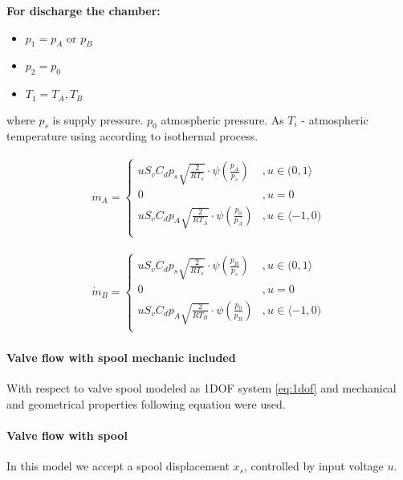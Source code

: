 \textbf{For discharge the chamber:}
\begin{itemize}
\item $p_1 = p_A \text{ or } p_B$
\item $p_2 = p_0$
\item $T_1 = T_A, T_B$
\end{itemize}

where $p_s$ is supply pressure. $p_0$ atmospheric pressure. As $T_i$ - 
atmospheric temperature using according to isothermal process.

\begin{align}
    \dot{m}_A =
    \begin{cases}
        u S_v C_d p_s \sqrt{\frac{2}{RT_s}}
        \cdot \psi\left(\frac{p_A}{p_s}\right)  &,   u \in (0, 1 \rangle \\
        0   &,  u = 0 \\
        u S_v C_d p_A \sqrt{\frac{2}{RT_A}}
        \cdot \psi\left(\frac{p_0}{p_A}\right)  &,   u \in \langle -1, 0) \\
    \end{cases}
\end{align}

\begin{align}
    \dot{m}_B =
    \begin{cases}
        u S_v C_d p_s \sqrt{\frac{2}{RT_s}}
        \cdot \psi\left(\frac{p_B}{p_s}\right)  &,   u \in (0, 1 \rangle \\
        0   &,  u = 0 \\
        u S_v C_d p_A \sqrt{\frac{2}{RT_B}}
        \cdot \psi\left(\frac{p_0}{p_B}\right)  &,   u \in \langle -1, 0) \\
    \end{cases}
\end{align}

\paragraph{Valve flow with spool mechanic included}

With respect to valve spool modeled as 1DOF system \ref{eq:1dof} and
mechanical and geometrical properties following equation were used.

\paragraph{Valve flow with spool}
In this model we accept a spool displacement $x_s$, controlled by input
voltage $u$.

